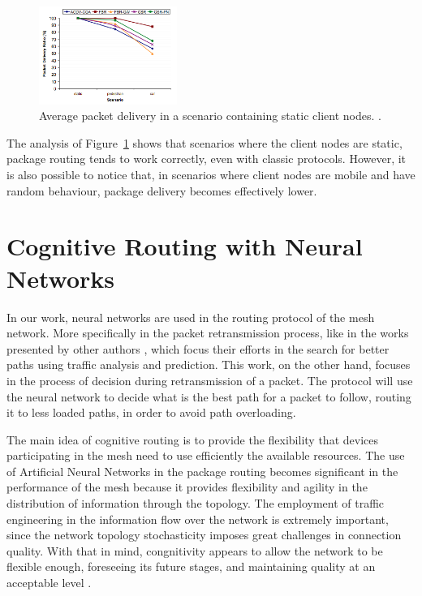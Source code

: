 \documentclass[10pt, conference, compsocconf]{IEEEtran}
\begin{document}
\begin{figure}[h]
	\centering
	\includegraphics[width=0.4\textwidth]{./graphics/Baumann_2.png}
    \caption{ Average packet delivery in a scenario containing static client nodes. \cite{Baumann:4390832}.}
    \label{fig:Baumann_2}
\end{figure}

The analysis of Figure~\ref{fig:Baumann_2} shows that scenarios where the client nodes are static, package routing tends to work correctly, even with classic protocols. However, it is also possible to notice that, in scenarios where client nodes are mobile and have random behaviour, package delivery becomes effectively lower.

\section{Cognitive Routing with Neural Networks}\label{sec:neural_mesh}

In our work, neural networks are used in the routing protocol of the mesh network. More specifically in the packet retransmission process, like in the works presented by other authors \cite{Venkataram:2002:NNB:638963.638974}, which focus their efforts in the search for better paths using traffic analysis and prediction. This work, on the other hand, focuses in the process of decision during retransmission of a packet. The protocol will use the neural network to decide what is the best path for a packet to follow, routing it to less loaded paths, in order to avoid path overloading.

The main idea of cognitive routing is to provide the flexibility that devices participating in the mesh need to use efficiently the available resources. The use of Artificial Neural Networks in the package routing becomes significant in the performance of the mesh because it provides flexibility and agility in the distribution of information through the topology. The employment of traffic engineering in the information flow over the network is extremely important, since the network topology stochasticity imposes great challenges in connection quality. With that in mind, congnitivity appears to allow the network to be flexible enough, foreseeing its future stages, and maintaining quality at an acceptable level \cite{Venkataram:2002:NNB:638963.638974}\cite{Zhi:5364647}\cite{Song:5072224}.
\end{document}
